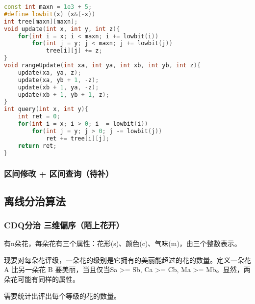 \begin{lstlisting}[language=C++]
const int maxn = 1e3 + 5;
#define lowbit(x) (x&(-x))
int tree[maxn][maxn];
void update(int x, int y, int z){
    for(int i = x; i < maxn; i += lowbit(i))
        for(int j = y; j < maxn; j += lowbit(j))
            tree[i][j] += z;
}
void rangeUpdate(int xa, int ya, int xb, int yb, int z){
    update(xa, ya, z);
    update(xa, yb + 1, -z);
    update(xb + 1, ya, -z);
    update(xb + 1, yb + 1, z);
}
int query(int x, int y){
    int ret = 0;
    for(int i = x; i > 0; i -= lowbit(i))
        for(int j = y; j > 0; j -= lowbit(j))
            ret += tree[i][j];
    return ret;
}
\end{lstlisting}

\subsubsection{区间修改 + 区间查询（待补）}

\subsection{离线分治算法}

\subsubsection{CDQ分治 三维偏序（陌上花开）}

有n朵花，每朵花有三个属性：花形(s)、颜色(c)、气味(m)，由三个整数表示。

现要对每朵花评级，一朵花的级别是它拥有的美丽能超过的花的数量。定义一朵花 A 比另一朵花 B 要美丽，当且仅当Sa >= Sb, Ca >= Cb, Ma >= Mb。显然，两朵花可能有同样的属性。

需要统计出评出每个等级的花的数量。

